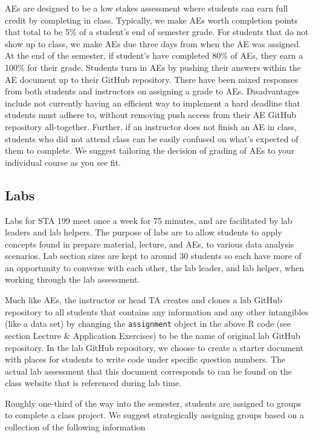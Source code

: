 \documentclass[
  12pt]{article}
\begin{document}
AEs are designed to be a low stakes assessment where students can earn
full credit by completing in class. Typically, we make AEs worth
completion points that total to be 5\% of a student's end of semester
grade. For students that do not show up to class, we make AEs due three
days from when the AE was assigned. At the end of the semester, if
student's have completed 80\% of AEs, they earn a 100\% for their grade.
Students turn in AEs by pushing their answers within the AE document up
to their GitHub repository. There have been mixed responses from both
students and instructors on assigning a grade to AEs. Disadvantages
include not currently having an efficient way to implement a hard
deadline that students must adhere to, without removing push access from
their AE GitHub repository all-together. Further, if an instructor does
not finish an AE in class, students who did not attend class can be
easily confused on what's expected of them to complete. We suggest
tailoring the decision of grading of AEs to your individual course as
you see fit.

\hypertarget{labs}{%
\subsection{Labs}\label{labs}}

Labs for STA 199 meet once a week for 75 minutes, and are facilitated by
lab leaders and lab helpers. The purpose of labs are to allow students
to apply concepts found in prepare material, lecture, and AEs, to
various data analysis scenarios. Lab section sizes are kept to around 30
students so each have more of an opportunity to converse with each
other, the lab leader, and lab helper, when working through the lab
assessment.

Much like AEs, the instructor or head TA creates and clones a lab GitHub
repository to all students that contains any information and any other
intangibles (like a data set) by changing the \texttt{assignment} object
in the above R code (see section Lecture \& Application Exercises) to be
the name of original lab GitHub repository. In the lab GitHub
repository, we choose to create a starter document with places for
students to write code under specific question numbers. The actual lab
assessment that this document corresponds to can be found on the class
website that is referenced during lab time.

Roughly one-third of the way into the semester, students are assigned to
groups to complete a class project. We suggest strategically assigning
groups based on a collection of the following information
\end{document}

